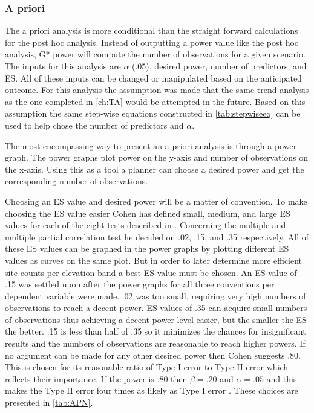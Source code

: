 \subsubsection{A priori}

The a priori analysis is more conditional than the straight forward calculations for the post hoc analysis.
Instead of outputting a power value like the post hoc analysis, G* power will compute the number of observations for a given scenario. 
The inputs for this analysis are $\alpha$ (.05), desired power, number of predictors, and ES.
All of these inputs can be changed or manipulated based on the anticipated outcome.
For this analysis the assumption was made that the same trend analysis as the one completed in \autoref{ch:TA} would be attempted in the future.
Based on this assumption the same step-wise equations constructed in \autoref{tab:stepwiseeq} can be used to help chose the number of predictors and $\alpha$.

The most encompassing way to present an a priori analysis is through a power graph.
The power graphs plot power on the y-axis and number of observations on the x-axis.
Using this as a tool a planner can choose a desired power and get the corresponding number of observations.

Choosing an ES value and desired power will be a matter of convention.
To make choosing the ES value easier Cohen has defined small, medium, and large ES values for each of the eight tests described in \citet{cohen1992power}.
Concerning the multiple and multiple partial correlation test he decided on .02, .15, and .35 respectively.
All of these ES values can be graphed in the power graphs by plotting different ES values as curves on the same plot.
But in order to later determine more efficient site counts per elevation band a best ES value must be chosen.
An ES value of .15 was settled upon after the power graphs for all three conventions per dependent variable were made.
.02 was too small, requiring very high numbers of observations to reach a decent power.
ES values of .35 can acquire small numbers of observations thus achieving a decent power level easier, but the smaller the ES the better.
.15 is less than half of .35 so it minimizes the chances for insignificant results and the numbers of observations are reasonable to reach higher powers.
If no argument can be made for any other desired power then Cohen suggests .80.
This is chosen for its reasonable ratio of Type I error to Type II error which reflects their importance.
If the power is .80 then $\beta=.20$ and $\alpha=.05$ and this makes the Type II error four times as likely as Type I error \citep{cohen1992statistical}.
These choices are presented in \autoref{tab:APN}.


